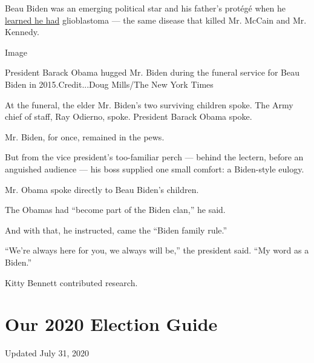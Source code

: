 Beau Biden was an emerging political star and his father's protégé when
he
\href{https://www.nytimes.com/2019/05/30/us/politics/joe-biden-beau-biden-death.html}{learned
he had} glioblastoma --- the same disease that killed Mr. McCain and Mr.
Kennedy.

Image

President Barack Obama hugged Mr. Biden during the funeral service for
Beau Biden in 2015.Credit...Doug Mills/The New York Times

At the funeral, the elder Mr. Biden's two surviving children spoke. The
Army chief of staff, Ray Odierno, spoke. President Barack Obama spoke.

Mr. Biden, for once, remained in the pews.

But from the vice president's too-familiar perch --- behind the lectern,
before an anguished audience --- his boss supplied one small comfort: a
Biden-style eulogy.

Mr. Obama spoke directly to Beau Biden's children.

The Obamas had ``become part of the Biden clan,'' he said.

And with that, he instructed, came the ``Biden family rule.''

``We're always here for you, we always will be,'' the president said.
``My word as a Biden.''

Kitty Bennett contributed research.

\hypertarget{our-2020-election-guide}{%
\section{Our 2020 Election Guide}\label{our-2020-election-guide}}

Updated July 31, 2020

